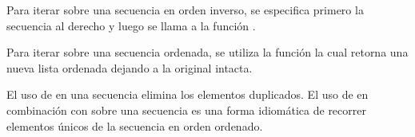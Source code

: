 \documentclass[a4,10pt,spanish]{sphinxmanual}
\begin{document}
\sphinxAtStartPar
Para iterar sobre una secuencia en orden inverso, se especifica primero la secuencia al derecho y luego se llama a la función .

\begin{sphinxVerbatim}[commandchars=\\\{\}]
     
    
\end{sphinxVerbatim}

\sphinxAtStartPar
Para iterar sobre una secuencia ordenada, se utiliza la función  la cual retorna una nueva lista ordenada dejando a la original intacta.

\begin{sphinxVerbatim}[commandchars=\\\{\}]
  \PYG{p}{[}     \PYG{p}{]}
   
    
\end{sphinxVerbatim}

\sphinxAtStartPar
El uso de  en una secuencia elimina los elementos duplicados. El uso de  en combinación con  sobre una secuencia es una forma idiomática de recorrer elementos únicos de la secuencia en orden ordenado.
\end{document}
